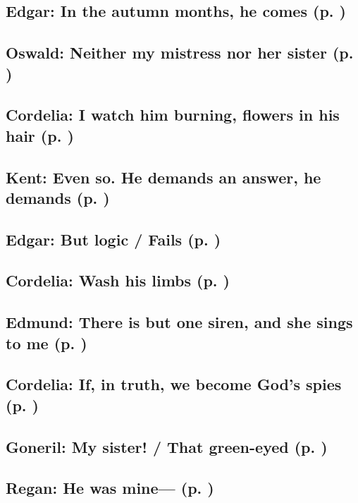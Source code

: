 \subsection{Edgar: In the autumn months, he comes (p. \pageref{ch:lear_be})}

\subsection{Oswald: Neither my mistress nor her sister (p. \pageref{ch:lear_bf})}

\subsection{Cordelia: I watch him burning, flowers in his hair (p. \pageref{ch:lear_bg})}

\subsection{Kent: Even so. He demands an answer, he demands (p. \pageref{ch:lear_bh})}

\subsection{Edgar: But logic / Fails (p. \pageref{ch:lear_bi})}

\subsection{Cordelia: Wash his limbs (p. \pageref{ch:lear_bj})}

\subsection{Edmund: There is but one siren, and she sings to me (p. \pageref{ch:lear_bk})}

\subsection{Cordelia: If, in truth, we become God's spies (p. \pageref{ch:lear_bl})}

\subsection{Goneril: My sister! / That green-eyed (p. \pageref{ch:lear_bm})}

\subsection{Regan: He was mine--- (p. \pageref{ch:lear_bn})}

